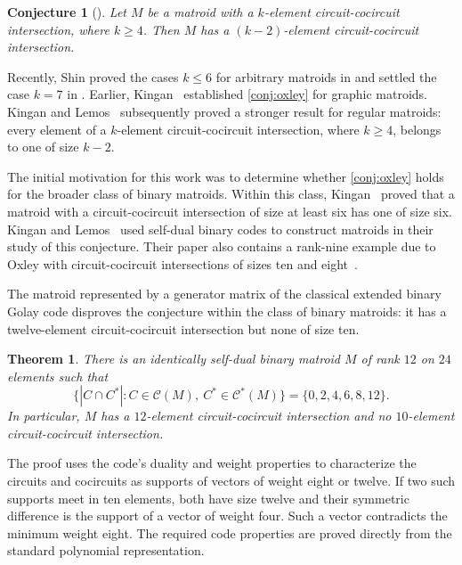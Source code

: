 \documentclass[11pt]{article}
\numberwithin{equation}{section}
\newtheorem{theorem}{Theorem}[section]
\newtheorem{conjecture}[conjecture]{Conjecture}
\begin{document}
\begin{conjecture}[{\cite[Conjecture~15.9.5]{Oxley2011}}]
\label{conj:oxley}
Let $M$ be a matroid with a $k$-element circuit-cocircuit intersection,
where $k\geq4$.
Then $M$ has a $(k-2)$-element circuit-cocircuit intersection.
\end{conjecture}

Recently, Shin proved the cases $k\leq6$ for arbitrary matroids
in \cite[Theorem~2.2]{Shin2021} and settled the case $k=7$
in \cite[Theorem~2.7]{Shin2023}.
Earlier, Kingan~\cite[Theorem~4.2]{Kingan1999} established
\autoref{conj:oxley} for graphic matroids.
Kingan and Lemos~\cite[Corollary~1.2]{KinganLemos2006} subsequently proved
a stronger result for regular matroids: every element of a $k$-element
circuit-cocircuit intersection, where $k\geq4$, belongs to one of size $k-2$.

The initial motivation for this work was to determine whether
\autoref{conj:oxley} holds for the broader class of binary matroids.
Within this class, Kingan~\cite[Theorem~2.3]{Kingan1999} proved that a matroid
with a circuit-cocircuit intersection of size at least six has one of size six.
Kingan and Lemos~\cite[pp.~472--473]{KinganLemos2006} used self-dual
binary codes to construct matroids in their study of this conjecture.
Their paper also contains a rank-nine example due to Oxley with circuit-cocircuit
intersections of sizes ten and eight~\cite[pp.~473, 480]{KinganLemos2006}.

The matroid represented by a generator matrix of the classical extended
binary Golay code disproves the conjecture within the class of binary
matroids: it has a twelve-element circuit-cocircuit intersection but none
of size ten.


\begin{theorem}\label{thm:main}
There is an identically self-dual binary matroid $M$ of rank $12$ on $24$
elements such that
\[
 \bigl\{|C\cap C^*|:
 C\in\mathcal C(M),\ C^*\in\mathcal C^*(M)\bigr\}
 =\{0,2,4,6,8,12\}.
\]
In particular, $M$ has a $12$-element circuit-cocircuit intersection and
no $10$-element circuit-cocircuit intersection.
\end{theorem}


The proof uses the code's duality and weight properties to characterize
the circuits and cocircuits as supports of vectors of weight eight or twelve.
If two such supports meet in ten elements, both have size twelve and their
symmetric difference is the support of a vector of weight four. Such a
vector contradicts the minimum weight eight. The required code properties
are proved directly from the standard polynomial representation.
\end{document}
